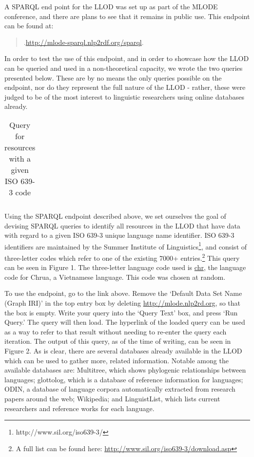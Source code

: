 
A SPARQL end point for the LLOD was set up as part of the MLODE conference, and there are plans to see that it remains in public use. This endpoint can be found at:
\begin{quote}.\url{http://mlode-sparql.nlp2rdf.org/sparql}.\end{quote}
In order to test the use of this endpoint, and in order to showcase how the LLOD can be queried and used in a non-theoretical capacity, we wrote the two queries presented below. These are by no means the only queries possible on the endpoint, nor do they represent the full nature of the LLOD - rather, these were judged to be of the most interest to linguistic researchers using online databases already. 

\begin{center}
\begin{table*}[t!]
\caption{Query for resources with a given ISO 639-3 code} \label{t1}
\begin{tabular}{lll}
\hline
{\footnotesize } \\
\hline
\end{tabular}
\end{table*}
\end{center}

Using the SPARQL endpoint described above, we set ourselves the goal of devising SPARQL queries to identify all resources in the LLOD that have data with regard to a given ISO 639-3 unique language name identifier. ISO 639-3 identifiers are maintained by the Summer Institute of Linguistics\footnote{http://www.sil.org/iso639-3/}, and consist of three-letter codes which refer to one of the existing 7000+ entries.\footnote{A full list can be found here: \url{http://www.sil.org/iso639-3/download.asp}} This query can be seen in Figure 1. The three-letter language code used is \url{chr}, the language code for Chrua, a Vietnamese language. This code was chosen at random. 

To use the endpoint, go to the link above. Remove the `Default Data Set Name (Graph IRI)' in the top entry box by deleting \url{http://mlode.nlp2rd.org}, so that the box is empty. Write your query into the `Query Text' box, and press `Run Query.' The query will then load. The hyperlink of the loaded query can be used as a way to refer to that result without needing to re-enter the query each iteration. The output of this query, as of the time of writing, can be seen in Figure 2. As is clear, there are several databases already available in the LLOD which can be used to gather more, related information. Notable among the available databases are: Multitree, which shows phylogenic relationships between languages; glottolog, which is a database of reference information for languages; ODIN, a database of language corpora automatically extracted from research papers around the web; Wikipedia; and LinguistList, which lists current researchers and reference works for each language. 

